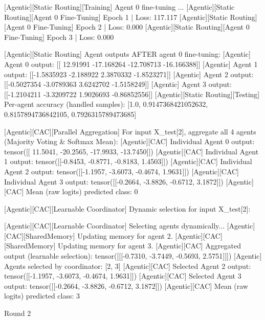 [Agentic][Static Routing][Training] Agent 0 fine-tuning ...
[Agentic][Static Routing][Agent 0 Fine-Tuning] Epoch 1 | Loss: 117.117
[Agentic][Static Routing][Agent 0 Fine-Tuning] Epoch 2 | Loss: 0.000
[Agentic][Static Routing][Agent 0 Fine-Tuning] Epoch 3 | Loss: 0.000

[Agentic][Static Routing] Agent outputs AFTER agent 0 fine-tuning:
[Agentic] Agent 0 output: [[ 12.91991  -17.168264 -12.708713 -16.166388]]
[Agentic] Agent 1 output: [[-1.5835923 -2.188922   2.3870332 -1.8523271]]
[Agentic] Agent 2 output: [[-0.5027354 -3.0789363  3.6242702 -1.5158249]]
[Agentic] Agent 3 output: [[-1.2104211  -3.3209722   1.9026693  -0.86852556]]
[Agentic][Static Routing][Testing] Per-agent accuracy (handled samples): [1.0, 0.9147368421052632, 0.8157894736842105, 0.7926315789473685]

[Agentic][CAC][Parallel Aggregation] For input X_test[2], aggregate all 4 agents (Majority Voting & Softmax Mean):
[Agentic][CAC] Individual Agent 0 output: tensor([[ 11.5041, -20.2565, -17.9933, -13.7450]])
[Agentic][CAC] Individual Agent 1 output: tensor([[-0.8453, -0.8771, -0.8183,  1.4503]])
[Agentic][CAC] Individual Agent 2 output: tensor([[-1.1957, -3.6073, -0.4674,  1.9631]])
[Agentic][CAC] Individual Agent 3 output: tensor([[-0.2664, -3.8826, -0.6712,  3.1872]])
[Agentic][CAC] Mean (raw logits) predicted class: 0

[Agentic][CAC][Learnable Coordinator] Dynamic selection for input X_test[2]:

[Agentic][CAC][Learnable Coordinator] Selecting agents dynamically...
[Agentic][CAC][SharedMemory] Updating memory for agent 2.
[Agentic][CAC][SharedMemory] Updating memory for agent 3.
[Agentic][CAC] Aggregated output (learnable selection): tensor([[[-0.7310, -3.7449, -0.5693,  2.5751]]])
[Agentic] Agents selected by coordinator: [2, 3]
[Agentic][CAC] Selected Agent 2 output: tensor([[-1.1957, -3.6073, -0.4674,  1.9631]])
[Agentic][CAC] Selected Agent 3 output: tensor([[-0.2664, -3.8826, -0.6712,  3.1872]])
[Agentic][CAC] Mean (raw logits) predicted class: 3

Round 2

